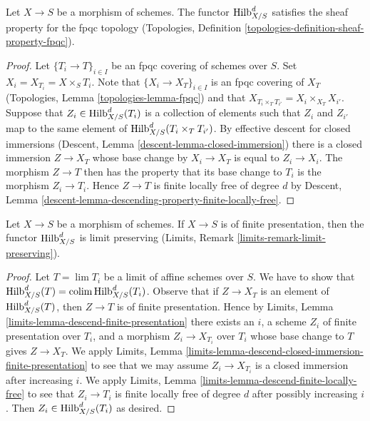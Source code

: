 \begin{lemma}
\label{lemma-hilb-d-sheaf}
Let $X \to S$ be a morphism of schemes. The functor $\mathrm{Hilb}^d_{X/S}$
satisfies the sheaf property for the fpqc topology
(Topologies, Definition \ref{topologies-definition-sheaf-property-fpqc}).
\end{lemma}

\begin{proof}
Let $\{T_i \to T\}_{i \in I}$ be an fpqc covering of schemes over $S$.
Set $X_i = X_{T_i} = X \times_S T_i$.
Note that $\{X_i \to X_T\}_{i \in I}$ is an fpqc covering of
$X_T$ (Topologies, Lemma \ref{topologies-lemma-fpqc})
and that $X_{T_i \times_T T_{i'}} = X_i \times_{X_T} X_{i'}$.
Suppose that $Z_i \in \mathrm{Hilb}^d_{X/S}(T_i)$ is a collection of
elements such that $Z_i$ and $Z_{i'}$ map to the same element of
$\mathrm{Hilb}^d_{X/S}(T_i \times_T T_{i'})$. By effective descent
for closed immersions (Descent, Lemma \ref{descent-lemma-closed-immersion})
there is a closed immersion $Z \to X_T$ whose base change by
$X_i \to X_T$ is equal to $Z_i \to X_i$. The morphism $Z \to T$
then has the property that its base change to $T_i$ is the morphism
$Z_i \to T_i$. Hence $Z \to T$ is finite locally free of degree $d$
by Descent, Lemma \ref{descent-lemma-descending-property-finite-locally-free}.
\end{proof}

\begin{lemma}
\label{lemma-hilb-d-limit-preserving}
Let $X \to S$ be a morphism of schemes. If $X \to S$ is
of finite presentation, then the functor $\mathrm{Hilb}^d_{X/S}$
is limit preserving (Limits, Remark \ref{limits-remark-limit-preserving}).
\end{lemma}

\begin{proof}
Let $T = \lim T_i$ be a limit of affine schemes over $S$. We have to show
that $\mathrm{Hilb}^d_{X/S}(T) = \mathop{\mathrm{colim}}\nolimits \mathrm{Hilb}^d_{X/S}(T_i)$.
Observe that if $Z \to X_T$ is an element of $\mathrm{Hilb}^d_{X/S}(T)$,
then $Z \to T$ is of finite presentation. Hence by
Limits, Lemma \ref{limits-lemma-descend-finite-presentation}
there exists an $i$, a scheme $Z_i$ of finite presentation over $T_i$,
and a morphism $Z_i \to X_{T_i}$ over $T_i$ whose base change to $T$
gives $Z \to X_T$. We apply Limits, Lemma
\ref{limits-lemma-descend-closed-immersion-finite-presentation}
to see that we may assume $Z_i \to X_{T_i}$ is a closed immersion
after increasing $i$.
We apply Limits, Lemma \ref{limits-lemma-descend-finite-locally-free}
to see that $Z_i \to T_i$ is finite locally free of degree $d$
after possibly increasing $i$.
Then $Z_i \in \mathrm{Hilb}^d_{X/S}(T_i)$ as desired.
\end{proof}

